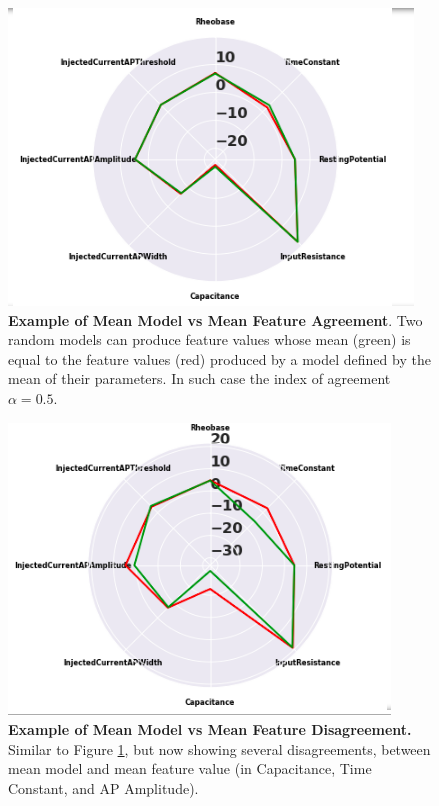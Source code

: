 \begin{figure}
    \centering
    \includegraphics{figures/model_similarities.png}
    \caption[Example of Mean Model Versus Mean Feature Agreement]{\textbf{Example of Mean Model vs Mean Feature Agreement}.
    Two random models can produce feature values whose mean (green) is equal to the feature values (red) produced by a model defined by the mean of their parameters.
    In such case the index of agreement $\alpha=0.5$.}
    \label{fig:mean-model-3}
\end{figure}

\begin{figure}
    \centering
    \includegraphics{figures/model_differences.png}
    \caption[Example of Mean Model Versus Mean Feature Disagreement]{\textbf{Example of Mean Model vs Mean Feature Disagreement.} Similar to Figure \ref{fig:mean-model-3}, but now showing several disagreements, between mean model and mean feature value (in Capacitance, Time Constant, and AP Amplitude).}
    \label{fig:mean-model-4}
\end{figure}

